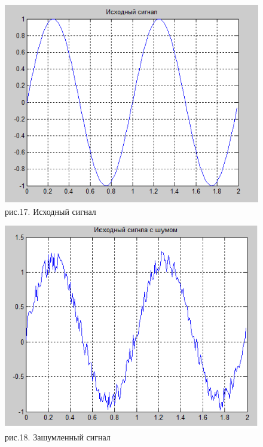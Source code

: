 \documentclass[10pt,a4paper]{report}
\begin{document}
\begin{figure}
\begin{center}
\includegraphics[angle=0, scale = 0.8]{6_1.png}\newline
рис.17. Исходный сигнал\newline
\end{center}
\end{figure}
\begin{figure}
\begin{center}
\includegraphics[angle=0, scale = 0.8]{6_2.png}\newline
рис.18. Зашумленный сигнал\newline
\end{center}
\end{figure}
\end{document}
